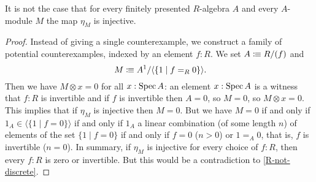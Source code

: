 \begin{example}
  It is not the case that
  for every finitely presented $R$-algebra $A$
  and every $A$-module $M$
  the map $\eta_M$ is injective.
\end{example}

\begin{proof}
  Instead of giving a single counterexample,
  we construct a family of potential counterexamples,
  indexed by an element $f : R$.
  We set $A \vcentcolon\mspace{-1.2mu}\equiv R/(f)$ and
  \[ M \colonequiv A^1 / \langle \{ 1 \mid f =_R 0 \} \rangle \rlap{.} \]
  Then we have $M \otimes x = 0$ for all $x : \operatorname{Spec} A$:
  an element $x : \operatorname{Spec} A$ is a witness that $f : R$ is invertible
  and if $f$ is invertible then $A = 0$, so $M = 0$, so $M \otimes x = 0$.
  This implies that
  if $\eta_M$ is injective
  then $M = 0$.
  But we have $M = 0$ if and only if
  $1_A \in \langle \{ 1 \mid f = 0 \} \rangle$
  if and only if
  $1_A$ a linear combination (of some length $n$)
  of elements of the set $\{ 1 \mid f = 0 \}$
  if and only if
  $f = 0$ ($n > 0$) or
  $1 =_A 0$, that is, $f$ is invertible ($n = 0$).
  In summary,
  if $\eta_M$ is injective for every choice of $f : R$,
  then every $f : R$ is zero or invertible.
  But this would be a contradiction to \cref{R-not-discrete}.
\end{proof}
